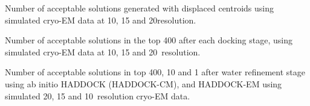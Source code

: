 \caption{}
{Number of acceptable solutions generated with displaced centroids
using simulated cryo-EM data at 10, 15 and 20\Angstrom resolution.}
\stopbuffer


\stopbuffer



\caption{}
{Number of acceptable solutions in the top 400 after each docking stage, using
simulated cryo-EM data at 10, 15 and 20\Angstrom\ resolution.}
\stopbuffer


\stopbuffer



\caption{}
{Number of acceptable solutions in top 400, 10 and 1 after water refinement
stage using ab initio HADDOCK (HADDOCK-CM), and HADDOCK-EM using simulated 20,
15 and 10\Angstrom\ resolution cryo-EM data.} 
\stopbuffer


\stopbuffer
